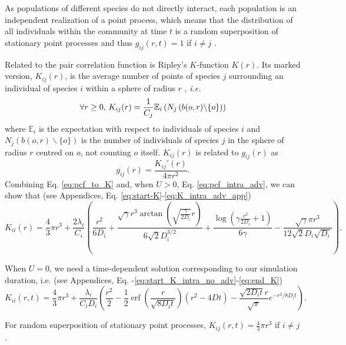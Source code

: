 \documentclass[english]{article}
\DeclareMathOperator\erf{erf}
\begin{document}
As populations of different species do not directly interact, each
population is an independent realization of a point process, which
means that the distribution of all individuals within the community
at time $t$ is a random superposition of stationary point processes
and thus $g_{ij}(r,t)=1$ if $i\neq j$ \citep[ p. 326, eq. 5.3.13]{illian2008statistical}.\medskip{}

Related to the pair correlation function is Ripley's $K$-function
$K(r)$. Its marked version, $K_{ij}(r)$, is the average number of
points of species $j$ surrounding an individual of species $i$ within
a sphere of radius $r$ \citep{illian2008statistical}, \textit{i.e.}
\begin{equation}
\forall r\geq0\textmd{, }K_{ij}(r)=\frac{1}{C_{j}}\mathbb{E}_{i}\left(N_{j}\left(b(o,r)\backslash\{o\}\right)\right)
\end{equation}
where $\mathbb{E}_{i}$ is the expectation with respect to individuals
of species $i$ and $N_{j}\left(b(o,r)\backslash\{o\}\right)$ is
the number of individuals of species $j$ in the sphere of radius
$r$ centred on $o$, not counting $o$ itself. $K_{ij}(r)$ is related
to $g_{ij}(r)$ as
\begin{equation}
g_{ij}(r)=\frac{K_{ij}'(r)}{4\pi r^{2}}.\label{eq:pcf_to_K}
\end{equation}
Combining Eq. \ref{eq:pcf_to_K} and, when $U>0$, Eq. \ref{eq:pcf_intra_adv},
we can show that (see Appendices, Eq. \ref{eq:start-K}-\ref{eq:K_intra_adv_app})
\begin{equation}
K_{ii}(r)=\frac{4}{3}\pi r^{3}+\frac{2\lambda_i}{C_{i}}\left(\frac{r^{2}}{6D_i}+\frac{\sqrt{\gamma}r^{3}\arctan(\sqrt{\frac{\gamma}{2D_i}}r)}{6\sqrt{2}D_i^{3/2}}+\frac{\log\left(\gamma\frac{r^{2}}{2D_i}+1\right)}{6\gamma}-\frac{\sqrt{\gamma}\pi r^{3}}{12\sqrt{2}D_i\sqrt{D_i}}\right).\label{eq:K_intra_adv}
\end{equation}

When $U=0$, we need a time-dependent solution corresponding to our
simulation duration, i.e. (see Appendices, Eq. -\ref{eq:start_K_intra_no_adv}-\ref{eq:end_K})
\begin{equation}
K_{ii}(r,t)=\frac{4}{3}\pi r^{3}+\frac{\lambda_i}{C_{i}D_i}\left(\frac{r^{2}}{2}-\frac{1}{2}\erf(\frac{r}{\sqrt{8D_i t}})(r^{2}-4Dt)-\frac{\sqrt{2D_i t}r}{\sqrt{\pi}}e^{-r^{2}/8D_i t}\right).\label{eq:K_intra_no_adv}
\end{equation}

For random superposition of stationary point processes, $K_{ij}(r,t)=\frac{4}{3}\pi r^{3}$
if $i\neq j$ \citep[p. 324, eq. 5.3.5]{illian2008statistical}.
\end{document}
